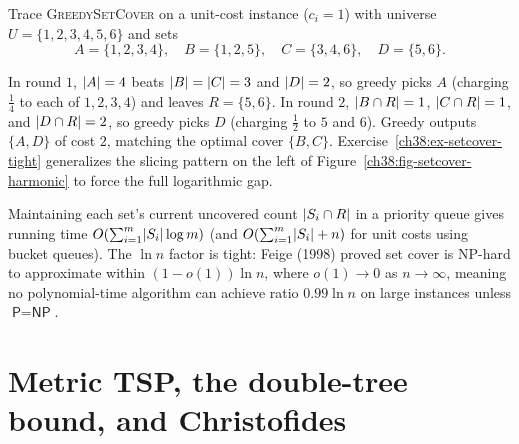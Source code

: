 \begin{labbox}
Trace \textsc{GreedySetCover} on a unit-cost instance ($c_i=1$) with universe $U=\{1,2,3,4,5,6\}$ and sets
\[
  A=\{1,2,3,4\},\quad B=\{1,2,5\},\quad C=\{3,4,6\},\quad D=\{5,6\}.
\]

\begin{center}
\end{center}

In round $1$, $\lvert A\rvert=4$ beats $\lvert B\rvert=\lvert C\rvert=3$ and $\lvert D\rvert=2$, so greedy picks $A$ (charging
$\tfrac14$ to each of $1,2,3,4$) and leaves $R=\{5,6\}$. In round $2$, $\lvert B\cap R\rvert=1$,
$\lvert C\cap R\rvert=1$, and $\lvert D\cap R\rvert=2$, so greedy picks $D$ (charging $\tfrac12$ to $5$ and $6$).
Greedy outputs $\{A,D\}$ of cost $2$, matching the optimal cover $\{B,C\}$. Exercise~\ref{ch38:ex-setcover-tight}
generalizes the slicing pattern on the left of Figure~\ref{ch38:fig-setcover-harmonic} to force the full logarithmic gap.
\end{labbox}

\begin{complexitybox}
Maintaining each set's current uncovered count $\lvert S_i\cap R\rvert$ in a priority queue gives running time
$O\!\left(\sum_{i=1}^m \lvert S_i\rvert\log m\right)$ (and $O\!\left(\sum_{i=1}^m \lvert S_i\rvert + n\right)$ for unit costs using bucket queues).
The $\ln n$ factor is tight: Feige (1998) proved set cover is \textsf{NP}-hard to approximate within
$(1-o(1))\ln n$, where $o(1)\to 0$ as $n\to\infty$, meaning no polynomial-time algorithm can achieve
ratio $0.99\ln n$ on large instances unless $\textsf{P}=\textsf{NP}$.
\end{complexitybox}

\section{Metric TSP, the double-tree bound, and Christofides}

